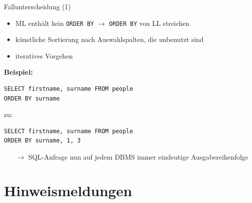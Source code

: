 \documentclass{beamer}
\begin{document}
\begin{frame}[fragile]{Fallunterscheidung (1)}
\begin{itemize}
\item ML enthält kein \verb|ORDER BY| $\to$ \verb|ORDER BY| von LL streichen
\item künstliche Sortierung nach Auswahlspalten, die unbenutzt sind
\item iteratives Vorgehen
\end{itemize}
\textbf{Beispiel:}\\
\begin{verbatim}
SELECT firstname, surname FROM people 
ORDER BY surname
\end{verbatim}
zu:
\begin{verbatim}
SELECT firstname, surname FROM people 
ORDER BY surname, 1, 3
\end{verbatim}
\begin{itemize}
\item[$\to$] SQL-Anfrage nun auf jedem DBMS immer eindeutige Ausgabereihenfolge
\end{itemize}
\end{frame}
%
%


\section{Hinweismeldungen}
\end{document}
